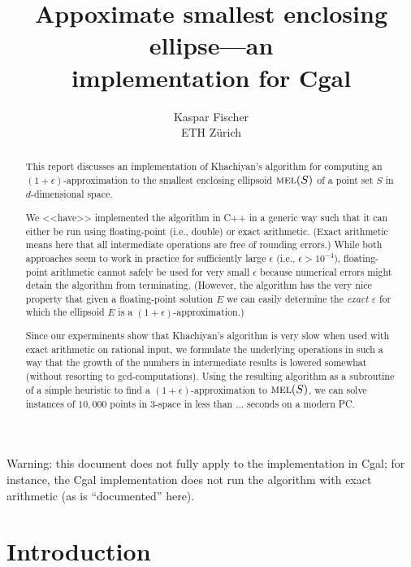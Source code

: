 \documentclass[a4paper,twocolumn]{article}
\newcommand{\MEL}{\ensuremath{\mathop{\textnormal{\textsc{mel}}}\nolimits}}
\begin{document}
\title{Appoximate smallest enclosing ellipse---an \\
implementation for {\sc Cgal}}
\author{Kaspar Fischer \\ ETH Z\"urich}
\maketitle

\begin{center}
  \begin{sc}
    Warning: this document does not fully apply to the implementation
    in Cgal; for instance, the Cgal implementation does not run the
    algorithm with exact arithmetic (as is ``documented'' here).
  \end{sc}
\end{center}

\begin{abstract}
  This report discusses an implementation of Khachiyan's algorithm
  \cite{k-rprnmc-96} for computing an $(1+\epsilon)$-approximation to
  the smallest enclosing ellipsoid $\MEL(S)$ of a point set $S$ in
  $d$-dimensional space.

  We <<have>> implemented the algorithm in C++ in a generic way such that
  it can either be run using floating-point (i.e., double) or exact
  arithmetic.  (Exact arithmetic means here that all intermediate
  operations are free of rounding errors.)  While both approaches seem
  to work in practice for sufficiently large $\epsilon$ (i.e.,
  $\epsilon>10^{-4}$), floating-point arithmetic cannot safely be used
  for very small $\epsilon$ because numerical errors might detain the
  algorithm from terminating.  (However, the algorithm has the very
  nice property that given a floating-point solution $E$ we can easily
  determine the \emph{exact} $\varepsilon$ for which the ellipsoid $E$ is a
  $(1+\epsilon)$-approximation.)

  Since our experminents show that Khachiyan's algorithm is very slow
  when used with exact arithmetic on rational input, we formulate the
  underlying operations in such a way that the growth of the numbers
  in intermediate results is lowered somewhat (without resorting to
  gcd-computations).  Using the resulting algorithm as a subroutine of
  a simple heuristic to find a $(1+\epsilon)$-approximation to
  $\MEL(S)$, we can solve instances of $10,\!000$ points in 3-space in
  less than ... seconds on a modern PC.
\end{abstract}

\section{Introduction}
\end{document}
